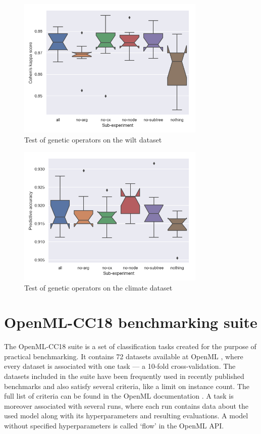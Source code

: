 \begin{figure}[pt]\centering
\includegraphics[width=0.8\textwidth]{../img/wilt-mut-redo.png}
\caption{Test of genetic operators on the wilt dataset}
\label{pic04:mut-wilt}
\end{figure}

\begin{figure}[pt]\centering
\includegraphics[width=0.8\textwidth]{../img/climate-mut-redo.png}
\caption{Test of genetic operators on the climate dataset}
\label{pic04:mut-climate}
\end{figure}

\section{OpenML-CC18 benchmarking suite}

The OpenML-CC18 suite is a set of classification tasks created for the purpose
of practical benchmarking. It contains 72 datasets available at OpenML
\citep{openmlcc18}, where
every dataset is associated with one task --- a 10-fold cross-validation. The
datasets included in the suite have been frequently used in recently published
benchmarks and also satisfy several criteria, like a limit on instance count.
The full list of criteria can be found in the OpenML documentation
\citep{openmlcc18docs}. A task is moreover associated with several runs, where
each run contains data about the used model along with its hyperparameters and
resulting evaluations. A model without specified hyperparameters is called
`flow' in the OpenML API.

